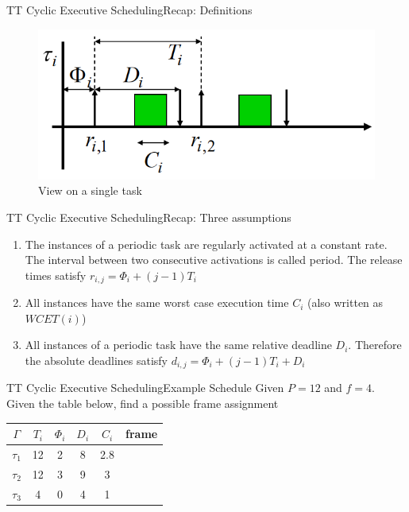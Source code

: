 \begin{frame}{TT Cyclic Executive Scheduling}{Recap: Definitions}
\begin{figure}
    \centering
    \includegraphics[scale=0.5]{figures/task_instance.png}
    \caption{View on a single task}
    \label{instanceView}
\end{figure}
\end{frame}

\begin{frame}{TT Cyclic Executive Scheduling}{Recap: Three assumptions}
\begin{enumerate}
    \item The instances of a periodic task are regularly activated at a constant rate. The interval between two consecutive activations is called period. The release times satisfy $r_{i,j} = \Phi_i + (j-1)T_i$
    \item All instances have the same worst case execution time $C_i$ (also written as $WCET(i)$)
    \item All instances of a periodic task have the same relative deadline $D_i$. Therefore the absolute deadlines satisfy $d_{i,j} = \Phi_i + (j-1)T_i + D_i$
\end{enumerate}
\end{frame}

\begin{frame}{TT Cyclic Executive Scheduling}{Example Schedule}
Given $P = 12$ and $f = 4$. Given the table below, find a possible frame assignment
\begin{center}
    \begin{tabular}{|c||c|c|c|c|c|}
    \hline
    $\Gamma$ & $T_i$ & $\Phi_i$ & $D_i$ & $C_i$ & frame\\
    \hline
    $\tau_1$ & 12 & 2 & 8 & 2.8 & \\
    \hline
    $\tau_2$ & 12 & 3 & 9 & 3 &\\
    \hline
    $\tau_3$ & 4 & 0 & 4 & 1 &\\
    \hline
\end{tabular}
\end{center}
\end{frame}

